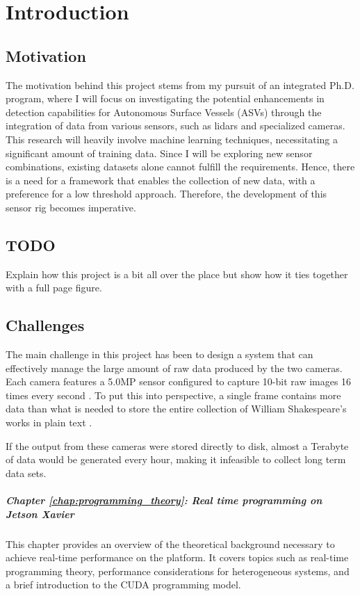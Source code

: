 \chapter{Introduction}

\section{Motivation}

The motivation behind this project stems from my pursuit of an integrated Ph.D.
program, where I will focus on investigating the potential enhancements in detection capabilities for Autonomous Surface Vessels (ASVs) through the integration of data from various sensors, such as lidars and specialized cameras.
This research will heavily involve machine learning techniques, necessitating a significant amount of training data.
Since I will be exploring new sensor combinations, existing datasets alone cannot fulfill the requirements.
Hence, there is a need for a framework that enables the collection of new data, with a preference for a low threshold approach.
Therefore, the development of this sensor rig becomes imperative.


\section{TODO}
Explain how this project is a bit all over the place but show how it ties together with a full page figure.

\section{Challenges}
The main challenge in this project has been to design a system that can effectively manage the large amount of raw data produced by the two cameras.
Each camera features a 5.0MP sensor configured to capture 10-bit raw images 16 times every second \cite{lucidvisionlabsTriton0MPPolarization}.
To put this into perspective, a single frame contains more data than what is needed to store the entire collection of William Shakespeare's works in plain text \cite{projectgutenbergCompleteWorksWilliam1994}.

If the output from these cameras were stored directly to disk, almost a Terabyte of data would be generated every hour, making it infeasible to collect long term data sets.

\paragraph{Chapter \ref{chap:programming_theory}: Real time programming on Jetson Xavier}
This chapter provides an overview of the theoretical background necessary to achieve real-time performance on the \jx platform.
It covers topics such as real-time programming theory, performance considerations for heterogeneous systems, and a brief introduction to the CUDA programming model.

